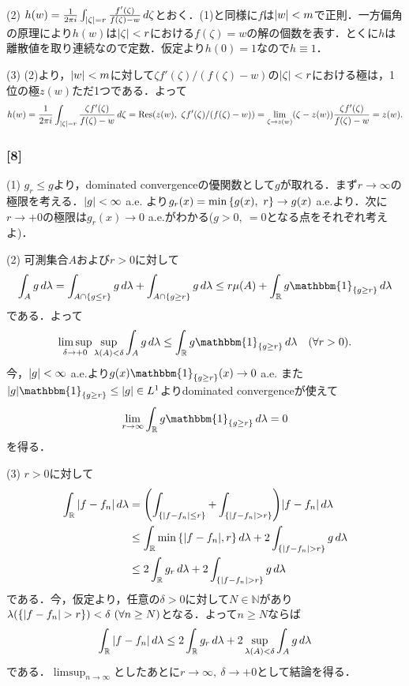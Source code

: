 \documentclass[a4j]{ltjsarticle}
\newcommand{\Rset}{\mathbb{R}}
\newcommand{\Nset}{\mathbb{N}}
\newcommand{\1}{\mathbbm{1}}
\numberwithin{equation}{section}
\theoremstyle{definition}
\begin{document}
(2) $h(w)=\frac{1}{2\pi i}\int_{\abs{\zeta}=r}\frac{f'(\zeta)}{f(\zeta)-w}\,d\zeta$とおく．(1)と同様に$f$は$\abs{w}<m$で正則．一方偏角の原理により$h(w)$は$\abs{\zeta}<r$における$f(\zeta)=w$の解の個数を表す．とくに$h$は離散値を取り連続なので定数．仮定より$h(0)=1$なので$h\equiv 1$．

(3) (2)より，$\abs{w}<m$に対して$\zeta f'(\zeta)/(f(\zeta)-w)$の$\abs{\zeta}<r$における極は，1位の極$z(w)$ただ1つである．よって
\begin{equation}
    h(w)=\frac{1}{2\pi i}\int_{\abs{\zeta}=r}\frac{\zeta f'(\zeta)}{f(\zeta)-w}\,d\zeta=\Residue(z(w),\ \zeta f'(\zeta)/(f(\zeta)-w))=\lim_{\zeta\to z(w)}(\zeta-z(w))\frac{\zeta f'(\zeta)}{f(\zeta)-w}=z(w).
\end{equation}
\subsubsection*{[8]}
(1) $g_r\leq g$より，dominated convergenceの優関数として$g$が取れる．まず$r\to\infty$の極限を考える．$\abs{g}<\infty$ a.e. より$g_r(x)=\min\qty{g(x),\ r}\to g(x)$ a.e.より．次に$r\to+0$の極限は$g_r(x)\to 0 $ a.e.がわかる($g>0,\ =0$となる点をそれぞれ考えよ)．

(2) 可測集合$A$および$r>0$に対して
\begin{equation}
    \int_{A}g\,d\lambda =\int_{A\cap\qty{g\leq r}}g\,d\lambda+\int_{A\cap\qty{g\geq r}}g\,d\lambda\leq r\mu(A)+\int_{\Rset}g\1_{\qty{g\geq r}}\,d\lambda 
\end{equation}
である．よって
\begin{equation}
    \limsup_{\delta\to+0}\sup_{\lambda(A)<\delta}\int_{A}g\,d\lambda\leq \int_{\Rset}g\1_{\qty{g\geq r}}\,d\lambda\quad (\forall r>0).
\end{equation}
今，$\abs{g}<\infty$ a.e.より$g(x)\1_{\qty{g\geq r}}(x)\to 0$ a.e. また$\abs{g}\1_{\qty{g\geq r}}\leq \abs{g}\in L^1$よりdominated convergenceが使えて
\begin{equation}
    \lim_{r\to\infty}\int_{\Rset}g\1_{\qty{g\geq r}}\,d\lambda=0
\end{equation}
を得る．

(3) $r>0$に対して
\begin{align}
    \int_{\Rset}\abs{f-f_n}\,d\lambda&=\qty(\int_{\qty{\abs{f-f_n}\leq r}}+\int_{\qty{\abs{f-f_n}>r}})\abs{f-f_n}\,d\lambda\\
    &\leq \int_{\Rset}\min\qty{\abs{f-f_n}, r}\,d\lambda+2\int_{\qty{\abs{f-f_n}>r}}g\,d\lambda\\
    &\leq 2\int_{\Rset}g_r\,d\lambda+2\int_{\qty{\abs{f-f_n}>r}}g\,d\lambda 
\end{align}
である．今，仮定より，任意の$\delta>0$に対して$N\in\Nset$があり$\lambda\qty(\qty{\abs{f-f_n}>r})<\delta\ (\forall n\geq N)$となる．よって$n\geq N$ならば
\begin{equation}
    \int_{\Rset}\abs{f-f_n}\,d\lambda\leq 2\int_{\Rset}g_r\,d\lambda+2\sup_{\lambda(A)<\delta}\int_{A}g\,d\lambda
\end{equation}
である．$\limsup_{n\to\infty}$としたあとに$r\to\infty,\ \delta\to+0$として結論を得る．
\end{document}
